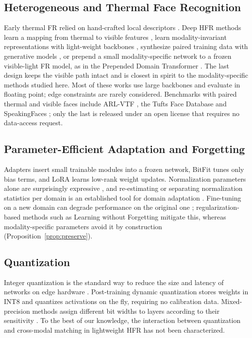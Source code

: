 \documentclass[journal]{IEEEtran}
\begin{document}
\subsection{Heterogeneous and Thermal Face Recognition}
Early thermal FR relied on hand-crafted local descriptors \cite{hermosilla2012thermal}. Deep HFR methods learn a mapping from thermal to visible features \cite{sarfraz2017dpm}, learn modality-invariant representations with light-weight backbones \cite{wu2018lightcnn}, synthesize paired training data with generative models \cite{fu2019dvg}, or prepend a small modality-specific network to a frozen visible-light FR model, as in the Prepended Domain Transformer \cite{george2023pdt}. The last design keeps the visible path intact and is closest in spirit to the modality-specific methods studied here. Most of these works use large backbones and evaluate in floating point; edge constraints are rarely considered. Benchmarks with paired thermal and visible faces include ARL-VTF \cite{poster2021arlvtf}, the Tufts Face Database \cite{panetta2020tufts} and SpeakingFaces \cite{abdrakhmanova2021speakingfaces}; only the last is released under an open license that requires no data-access request.

\subsection{Parameter-Efficient Adaptation and Forgetting}
Adapters \cite{houlsby2019adapters} insert small trainable modules into a frozen network, BitFit \cite{benzaken2022bitfit} tunes only bias terms, and LoRA \cite{hu2022lora} learns low-rank weight updates. Normalization parameters alone are surprisingly expressive \cite{frankle2021batchnorm}, and re-estimating or separating normalization statistics per domain is an established tool for domain adaptation \cite{li2018adabn,chang2019dsbn}. Fine-tuning on a new domain can degrade performance on the original one \cite{kirkpatrick2017ewc}; regularization-based methods such as Learning without Forgetting \cite{li2018lwf} mitigate this, whereas modality-specific parameters avoid it by construction (Proposition~\ref{prop:preserve}).

\subsection{Quantization}
Integer quantization \cite{jacob2018quantization} is the standard way to reduce the size and latency of networks on edge hardware \cite{krishnamoorthi2018whitepaper,nagel2021whitepaper,gholami2021survey,wu2020integer}. Post-training dynamic quantization stores weights in INT8 and quantizes activations on the fly, requiring no calibration data. Mixed-precision methods assign different bit widths to layers according to their sensitivity \cite{dong2019hawq}. To the best of our knowledge, the interaction between quantization and cross-modal matching in lightweight HFR has not been characterized.
\end{document}
